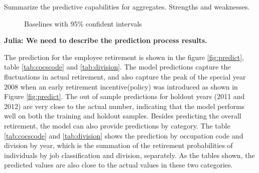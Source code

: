 \documentclass[12pt,letterpaper]{article}
\begin{document}
Summarize the predictive capabilities for aggregates.  Strengths and weaknesses.
\begin{figure}[h!]
	\centering
	\caption{Baselines with 95\% confident intervals}
	\label{fig:basepred}
\end{figure}

{\bf Julia: We need to describe the prediction process results.}

The prediction for the employee retirement is shown in the figure \ref{fig:predict}, table \ref{tab:cocscode} and \ref{tab:division}. The model predictions capture the fluctuations in actual retirement, and also capture the peak of the special year 2008 when an early retirement incentive(policy) was introduced as shown in Figure \ref{fig:predict}. The out of sample predictions for holdout years (2011 and 2012) are very close to the actual number, indicating that the model performs well on both the training and holdout samples. Besides predicting the overall retirement, the model can also provide predictions by category. The table \ref{tab:cocscode} and \ref{tab:division} shows the prediction by occupation code and division by year, which is the summation of the retirement probabilities of individuals by job classification and division, separately. As the tables shown, the predicted values are also close to the actual values in these two categories.
\end{document}
